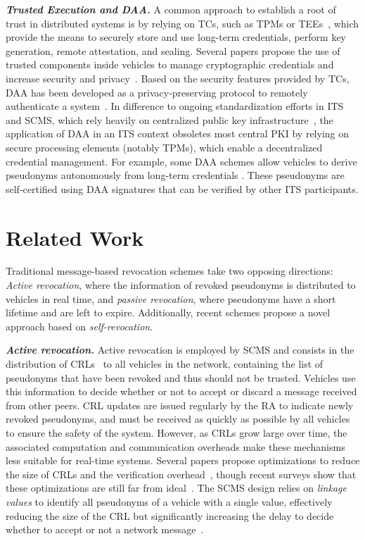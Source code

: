 \noindent\textbf{\emph{Trusted Execution and DAA.}}
%
A common approach to establish a root of trust in distributed systems is by
relying on \acfp{TC}, such as \acp{TPM} or \acp{TEE}~\cite{maene:hardware},
which provide the means to securely store and use long-term credentials, perform
key generation, remote attestation, and sealing.
%
Several papers propose the use of trusted components inside vehicles to manage
cryptographic credentials and increase security and
privacy~\cite{guette2009vanet,wagan2010vanet,jangid2022towards}.
%
Based on the security features provided by \acp{TC}, \acf{DAA} has been
developed as a privacy-preserving protocol to remotely authenticate a
system~\cite{brickell2004direct,tpm2015ieee11889}. In difference to ongoing
standardization efforts in \ac{ITS} and \ac{SCMS}, which rely heavily on
centralized public key
infrastructure~\cite{etsi2021102940,etsi2022102941,brecht2018scms}, the
application of \ac{DAA} in an \ac{ITS} context obsoletes most central PKI by
relying on secure processing elements (notably \acp{TPM}), which enable a
decentralized credential management. For example, some \ac{DAA} schemes allow
vehicles to derive pseudonyms autonomously from long-term credentials
\cite{whitefield2017privacy,desmoulins2019practical}. These pseudonyms are
self-certified using \ac{DAA} signatures that can be verified by other \ac{ITS}
participants. 

\section{Related Work}
\label{related-work}

Traditional message-based revocation schemes take two opposing directions:
\emph{Active revocation}, where the information of revoked pseudonyms is
distributed to vehicles in real time, and \emph{passive revocation}, where
pseudonyms have a short lifetime and are left to expire. Additionally, recent
schemes propose a novel approach based on \emph{self-revocation}.

\noindent\textbf{\emph{Active revocation.}}
%
Active revocation is employed by \ac{SCMS} and consists in the distribution of
\acp{CRL}~\cite{ietfcrl} to all vehicles in the network, containing the list of
pseudonyms that have been revoked and thus should not be trusted. Vehicles use
this information to decide whether or not to accept or discard a message
received from other peers. \ac{CRL} updates are issued regularly by the \ac{RA}
to indicate newly revoked pseudonyms, and must be received as quickly as
possible by all vehicles to ensure the safety of the system. However, as
\acp{CRL} grow large over time, the associated computation and communication
overheads make these mechanisms less suitable for real-time systems. Several
papers propose optimizations to reduce the size of \acp{CRL} and the
verification overhead~\cite{simplicio2019acpc,kumar2017binary}, though recent
surveys show that these optimizations are still far from
ideal~\cite{wang2020certificate,yoshizawa2022v2x_survey}. The \ac{SCMS} design
relies on \emph{linkage values} to identify all pseudonyms of a vehicle with a
single value, effectively reducing the size of the \ac{CRL} but significantly
increasing the delay to decide whether to accept or not a network
message~\cite{brecht2018scms}.

